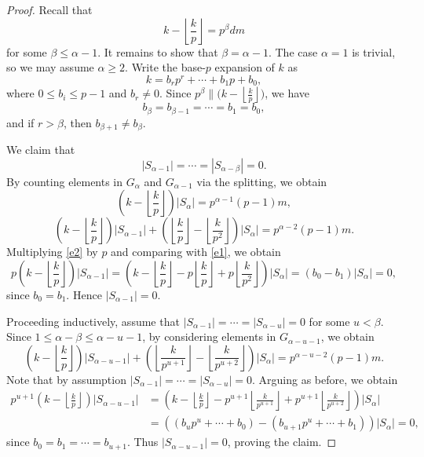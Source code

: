 \documentclass[12pt]{article}
\begin{document}
\begin{proof}
Recall that
\[
k - \left\lfloor \frac{k}{p} \right\rfloor = p^{\beta} d m
\]
for some \(\beta \le \alpha - 1\). It remains to show that \(\beta = \alpha - 1\). The case \(\alpha = 1\) is trivial, so we may assume \(\alpha \ge 2\).
Write the base-\(p\) expansion of \(k\) as
\[
k = b_r p^r + \cdots + b_1 p + b_0,
\]
where \(0 \le b_i \le p-1\) and \(b_r \neq 0\). Since \(p^{\beta} \parallel \bigl(k - \left\lfloor \frac{k}{p} \right\rfloor\bigr)\), we have
\[
b_{\beta} = b_{\beta-1} = \cdots = b_1 = b_0,
\]
and if \(r > \beta\), then \(b_{\beta+1} \ne b_{\beta}\).

We claim that
\[
|S_{\alpha-1}| = \cdots = |S_{\alpha-\beta}| = 0.
\]
By counting elements in \(G_{\alpha}\) and \(G_{\alpha-1}\) via the splitting, we obtain
\begin{equation}\label{e1}
\left(k - \left\lfloor \frac{k}{p} \right\rfloor\right) |S_{\alpha}|
= p^{\alpha-1}(p-1)m,
\end{equation}
\begin{equation}\label{e2}
\left(k - \left\lfloor \frac{k}{p} \right\rfloor\right) |S_{\alpha-1}|
+ \left(\left\lfloor \frac{k}{p} \right\rfloor - \left\lfloor \frac{k}{p^2} \right\rfloor\right) |S_{\alpha}|
= p^{\alpha-2}(p-1)m.
\end{equation}
Multiplying \eqref{e2} by \(p\) and comparing with \eqref{e1}, we obtain
\[
p\left(k - \left\lfloor \frac{k}{p} \right\rfloor\right) |S_{\alpha-1}|
= \left(k - \left\lfloor \frac{k}{p} \right\rfloor - p \left\lfloor \frac{k}{p} \right\rfloor + p \left\lfloor \frac{k}{p^2} \right\rfloor\right) |S_{\alpha}|
= (b_0 - b_1) |S_{\alpha}| = 0,
\]
since \(b_0 = b_1\). Hence \(|S_{\alpha-1}| = 0\).

Proceeding inductively, assume that \(|S_{\alpha-1}| = \cdots = |S_{\alpha-u}| = 0\) for some \(u < \beta\). Since $1\leq \alpha-\beta\leq \alpha -u-1$, by considering elements in  \(G_{\alpha-u-1}\), we obtain
\begin{equation}\label{e4}
\left(k - \left\lfloor \frac{k}{p} \right\rfloor\right) |S_{\alpha-u-1}|
+ \left(\left\lfloor \frac{k}{p^{u+1}} \right\rfloor - \left\lfloor \frac{k}{p^{u+2}} \right\rfloor\right) |S_{\alpha}|
= p^{\alpha-u-2}(p-1)m.
\end{equation}
Note that by assumption $|S_{\alpha-1}|= \cdots = |S_{\alpha-u}| = 0$. 
Arguing as before, we obtain
\begin{align*}
p^{u+1}\left(k - \left\lfloor \frac{k}{p} \right\rfloor\right) |S_{\alpha-u-1}|
&= \left(k - \left\lfloor \frac{k}{p} \right\rfloor - p^{u+1} \left\lfloor \frac{k}{p^{u+1}} \right\rfloor + p^{u+1} \left\lfloor \frac{k}{p^{u+2}} \right\rfloor\right) |S_{\alpha}| \\
&= ((b_up^u+\cdots+b_0)-(b_{u+1}p^u+\cdots+b_1))|S_{\alpha}| = 0,
\end{align*}
since \(b_0=b_1=\cdots = b_{u+1}\). Thus \(|S_{\alpha-u-1}| = 0\), proving the claim.


\end{proof}
\end{document}
